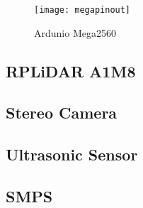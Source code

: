 \begin{figure}[H]
    \centering
        \texttt{[image: megapinout]}
        \caption{Ardunio Mega2560}
        \label{fig:megapinout}
\end{figure}

\newpage
\subsection{RPLiDAR A1M8}
\subsection{Stereo Camera}
\subsection{Ultrasonic Sensor}
\subsection{SMPS}

